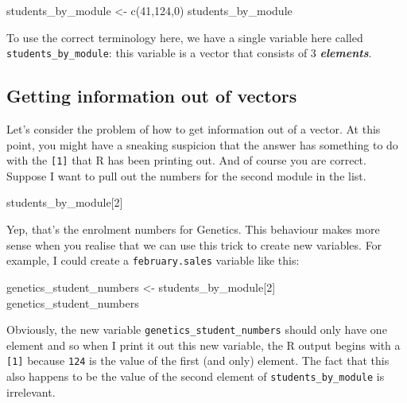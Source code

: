 \documentclass[
]{book}
\newenvironment{Shaded}{\begin{snugshade}}{\end{snugshade}}
\newcommand{\DecValTok}[1]{\textcolor[rgb]{0.00,0.00,0.81}{#1}}
\newcommand{\FunctionTok}[1]{\textcolor[rgb]{0.00,0.00,0.00}{#1}}
\newcommand{\NormalTok}[1]{#1}
\newcommand{\OtherTok}[1]{\textcolor[rgb]{0.56,0.35,0.01}{#1}}
\begin{document}
\begin{Shaded}
\begin{Highlighting}[]
\NormalTok{students\_by\_module }\OtherTok{\textless{}{-}} \FunctionTok{c}\NormalTok{(}\DecValTok{41}\NormalTok{,}\DecValTok{124}\NormalTok{,}\DecValTok{0}\NormalTok{)}
\NormalTok{students\_by\_module}
\end{Highlighting}
\end{Shaded}

To use the correct terminology here, we have a single variable here called \texttt{students\_by\_module}: this variable is a vector that consists of 3 \textbf{\emph{elements}}.

\hypertarget{vectorsubset}{%
\subsection{Getting information out of vectors}\label{vectorsubset}}

Let's consider the problem of how to get information out of a vector. At this point, you might have a sneaking suspicion that the answer has something to do with the \texttt{{[}1{]}} that R has been printing out. And of course you are correct. Suppose I want to pull out the numbers for the second module in the list.

\begin{Shaded}
\begin{Highlighting}[]
\NormalTok{students\_by\_module[}\DecValTok{2}\NormalTok{]}
\end{Highlighting}
\end{Shaded}

Yep, that's the enrolment numbers for Genetics.
This behaviour makes more sense when you realise that we can use this trick to create new variables. For example, I could create a \texttt{february.sales} variable like this:

\begin{Shaded}
\begin{Highlighting}[]
\NormalTok{genetics\_student\_numbers }\OtherTok{\textless{}{-}}\NormalTok{ students\_by\_module[}\DecValTok{2}\NormalTok{]}
\NormalTok{genetics\_student\_numbers}
\end{Highlighting}
\end{Shaded}

Obviously, the new variable \texttt{genetics\_student\_numbers} should only have one element and so when I print it out this new variable, the R output begins with a \texttt{{[}1{]}} because \texttt{124} is the value of the first (and only) element. The fact that this also happens to be the value of the second element of \texttt{students\_by\_module} is irrelevant.
\end{document}
